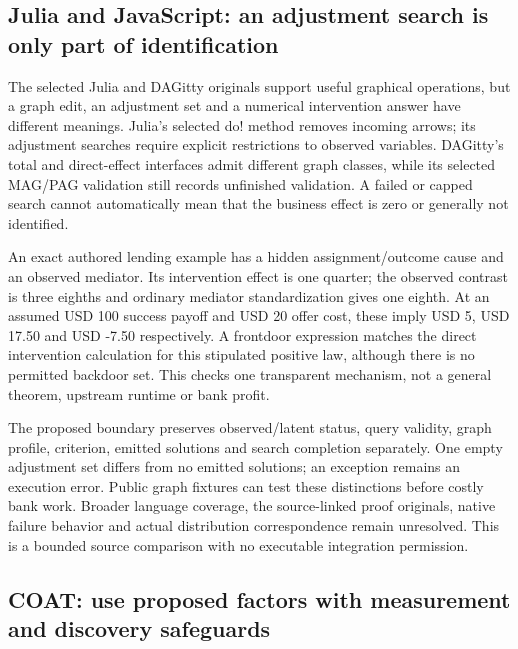 \hypertarget{julia-and-javascript-an-adjustment-search-is-only-part-of-identification}{%
\subsection{Julia and JavaScript: an adjustment search is only part of
identification}\label{julia-and-javascript-an-adjustment-search-is-only-part-of-identification}}

The selected Julia and DAGitty originals support useful graphical
operations, but a graph edit, an adjustment set and a numerical
intervention answer have different meanings. Julia's selected do! method
removes incoming arrows; its adjustment searches require explicit
restrictions to observed variables. DAGitty's total and direct-effect
interfaces admit different graph classes, while its selected MAG/PAG
validation still records unfinished validation. A failed or capped
search cannot automatically mean that the business effect is zero or
generally not identified.
\citep{exec19_otherid_julia,exec19_otherid_dagitty}

An exact authored lending example has a hidden assignment/outcome cause
and an observed mediator. Its intervention effect is one quarter; the
observed contrast is three eighths and ordinary mediator standardization
gives one eighth. At an assumed USD 100 success payoff and USD 20 offer
cost, these imply USD 5, USD 17.50 and USD -7.50 respectively. A
frontdoor expression matches the direct intervention calculation for
this stipulated positive law, although there is no permitted backdoor
set. This checks one transparent mechanism, not a general theorem,
upstream runtime or bank profit. \citep{exec19_otherid_reference}

The proposed boundary preserves observed/latent status, query validity,
graph profile, criterion, emitted solutions and search completion
separately. One empty adjustment set differs from no emitted solutions;
an exception remains an execution error. Public graph fixtures can test
these distinctions before costly bank work. Broader language coverage,
the source-linked proof originals, native failure behavior and actual
distribution correspondence remain unresolved. This is a bounded source
comparison with no executable integration permission.
\citep{exec19_otherid_julia,exec19_otherid_dagitty,exec19_otherid_reference}

\hypertarget{coat-use-proposed-factors-with-measurement-and-discovery-safeguards}{%
\subsection{COAT: use proposed factors with measurement and discovery
safeguards}\label{coat-use-proposed-factors-with-measurement-and-discovery-safeguards}}

